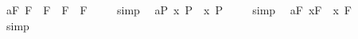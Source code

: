 \begin{isabellebody}
\isamarkupfalse%
\ a{}{}{\isacharunderscore}{}{\isacharunderscore}F{\isacharcolon}\ {\isachardoublequoteopen}{\isacharbrackleft}{\isasymA}{\isacharparenleft}{\isasymphi}\isactrlsup F\ \isactrlbold {\isasymrightarrow}\ {\isacharparenleft}{\isasympsi}\isactrlsup F{\isacharparenright}{\isacharparenright}\ \isactrlbold {\isasymequiv}\ {\isacharparenleft}{\isasymA}{\isacharparenleft}{\isasymphi}\isactrlsup F{\isacharparenright}\ \isactrlbold {\isasymrightarrow}\ {\isasymA}{\isacharparenleft}{\isasympsi}\isactrlsup F{\isacharparenright}{\isacharparenright}{\isacharbrackright}\ {\isacharequal}\ {\isasymtop}{\isachardoublequoteclose}%
\isadelimproof
\ %
\endisadelimproof
%
\isatagproof
{}\isamarkupfalse%
\ simp\ \isamarkupfalse%
%
\endisatagproof
{\isafoldproof}%
%
\isadelimproof
%
\endisadelimproof
\isanewline
{}\isamarkupfalse%
\ a{}{}{\isacharunderscore}{}{\isacharunderscore}P{\isacharcolon}\ {\isachardoublequoteopen}{\isacharbrackleft}{\isasymA}{\isacharparenleft}\isactrlbold {\isasymforall}x{\isachardot}\ {\isacharparenleft}{\isasymphi}\isactrlsup P{\isacharparenright}{\isacharparenright}\ \isactrlbold {\isasymequiv}\ {\isacharparenleft}\isactrlbold {\isasymforall}x{\isachardot}\ {\isasymA}{\isacharparenleft}{\isasymphi}\isactrlsup P{\isacharparenright}{\isacharparenright}{\isacharbrackright}\ {\isacharequal}\ {\isasymtop}{\isachardoublequoteclose}%
\isadelimproof
\ %
\endisadelimproof
%
\isatagproof
{}\isamarkupfalse%
\ simp\ \isamarkupfalse%
%
\endisatagproof
{\isafoldproof}%
%
\isadelimproof
%
\endisadelimproof
\isanewline
{}\isamarkupfalse%
\ a{}{}{\isacharunderscore}{}{\isacharunderscore}F{\isacharcolon}\ {\isachardoublequoteopen}{\isacharbrackleft}{\isacharparenleft}{\isasymA}{\isacharparenleft}\isactrlbold {\isasymforall}x{\isachardot}{\isacharparenleft}{\isasymphi}\isactrlsup F{\isacharparenright}{\isacharparenright}\ \isactrlbold {\isasymequiv}\ {\isacharparenleft}\isactrlbold {\isasymforall}x{\isachardot}\ {\isasymA}{\isacharparenleft}{\isasymphi}\isactrlsup F{\isacharparenright}{\isacharparenright}{\isacharparenright}{\isacharbrackright}\ {\isacharequal}\ {\isasymtop}{\isachardoublequoteclose}%
\isadelimproof
\ %
\endisadelimproof
%
\isatagproof
{}\isamarkupfalse%
\ simp\ \isamarkupfalse%
%
\endisatagproof
{\isafoldproof}%
%
\isadelimproof
%
\endisadelimproof
\isanewline
{}\isamarkupfalse%

\end{isabellebody}
